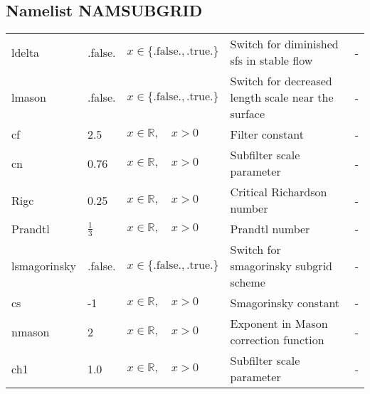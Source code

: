 \documentclass[twoside,11pt,fleqn,a4paper,english,openright]{report}
\begin{document}
\subsection{Namelist NAMSUBGRID}\label{par:subgrid}

\begin{center}
  \tablelasttail{
        &&&&\\\hline
  }
\begin{supertabular}{|l|p{1.6cm}|p{4cm}|p{6cm}|l|}
  ldelta	& .false.	& $x\in\{\text{.false.},\text{.true.}\}$	& Switch for diminished sfs in stable flow		& -\\
  lmason	& .false.	& $x\in\{\text{.false.},\text{.true.}\}$	& Switch for decreased length scale near the surface	& -\\
  cf		& 2.5		& $x \in \mathbb{R}, \quad x>0$	& Filter constant					& -\\
  cn		& 0.76		& $x \in \mathbb{R}, \quad x>0$	& Subfilter scale parameter				& -\\
  Rigc		& 0.25		& $x \in \mathbb{R}, \quad x>0$	& Critical Richardson number				& -\\
  Prandtl	& $\frac{1}{3}$	& $x \in \mathbb{R}, \quad x>0$	& Prandtl number					& -\\
  lsmagorinsky & .false.& $x\in\{\text{.false.},\text{.true.}\}$	& Switch for smagorinsky subgrid scheme & -\\
  cs	& -1	& $x \in \mathbb{R}, \quad x>0$ & Smagorinsky constant	& -\\
  nmason	& 2	& $x \in \mathbb{R}, \quad x>0$ & Exponent in Mason correction function & -\\
  ch1		& 1.0		& $x \in \mathbb{R}, \quad x>0$	& Subfilter scale parameter					& -\\
\end{supertabular}
\end{center}
\end{document}
